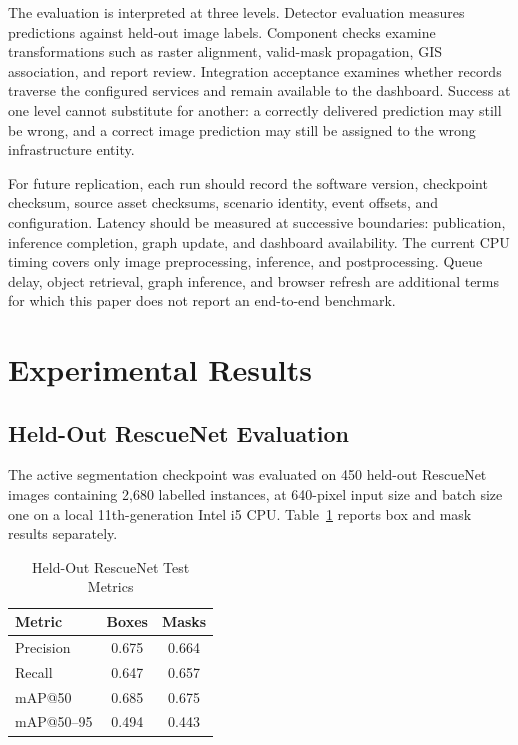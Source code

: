 \documentclass[conference]{IEEEtran}
\newcommand{\changed}[1]{{\color{blue}#1}}
\newcommand{\changed}[1]{#1}
\begin{document}
\changed{The evaluation is interpreted at three levels. Detector evaluation measures predictions against held-out image labels. Component checks examine transformations such as raster alignment, valid-mask propagation, GIS association, and report review. Integration acceptance examines whether records traverse the configured services and remain available to the dashboard. Success at one level cannot substitute for another: a correctly delivered prediction may still be wrong, and a correct image prediction may still be assigned to the wrong infrastructure entity.}

\changed{For future replication, each run should record the software version, checkpoint checksum, source asset checksums, scenario identity, event offsets, and configuration. Latency should be measured at successive boundaries: publication, inference completion, graph update, and dashboard availability. The current CPU timing covers only image preprocessing, inference, and postprocessing. Queue delay, object retrieval, graph inference, and browser refresh are additional terms for which this paper does not report an end-to-end benchmark.}

\section{Experimental Results}
\subsection{Held-Out RescueNet Evaluation}
The active segmentation checkpoint was evaluated on 450 held-out RescueNet images containing 2,680 labelled instances, at 640-pixel input size and batch size one on a local 11th-generation Intel i5 CPU. Table~\ref{tab:metrics} reports box and mask results separately.
\begin{table}[t]
\caption{Held-Out RescueNet Test Metrics}
\label{tab:metrics}
\centering
\footnotesize
\begin{tabular}{lcc}
\toprule
\textbf{Metric} & \textbf{Boxes} & \textbf{Masks}\\
\midrule
Precision & 0.675 & 0.664\\
Recall & 0.647 & 0.657\\
mAP@50 & 0.685 & 0.675\\
mAP@50--95 & 0.494 & 0.443\\
\bottomrule
\end{tabular}
\end{table}
\end{document}
